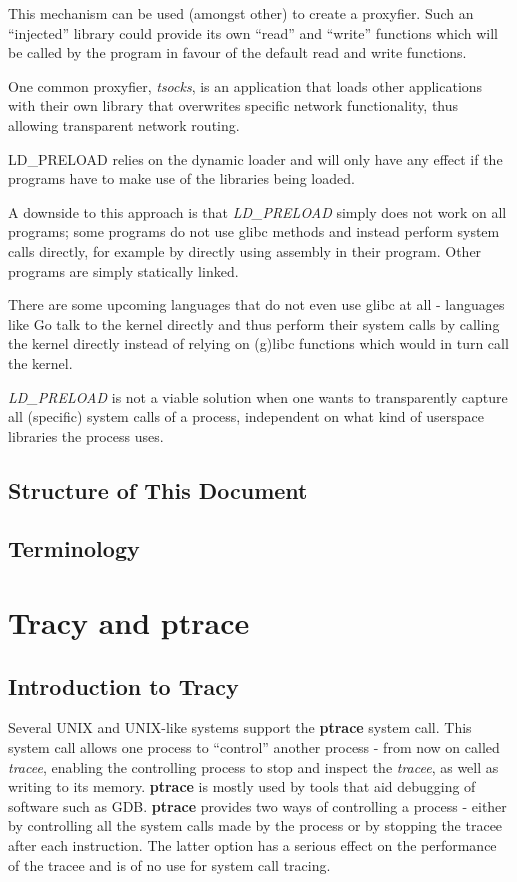 \documentclass[a4paper, 10pt]{report}
\begin{document}
This mechanism can be used (amongst other) to create a proxyfier.
Such an ``injected'' library could provide its own ``read'' and
``write'' functions which will be called by the program in favour of
the default read and write functions.

One common proxyfier, \textit{tsocks}, is an application that loads
other applications with their own library that overwrites specific
network functionality, thus allowing transparent network routing.

LD\_PRELOAD relies on the dynamic loader and will only have any effect
if the programs have to make use of the libraries being loaded.

A downside to this approach is that \textit{LD\_PRELOAD} simply does not work
on all programs; some programs do not use glibc methods and instead perform
system calls directly, for example by directly using assembly in their program.
Other programs are simply statically linked. %

There are some upcoming languages that do not even use glibc at all - languages
like Go \cite{golang} talk to the kernel directly and thus perform their
system calls by calling the kernel directly instead of
relying on (g)libc functions which would in turn call the kernel.

\textit{LD\_PRELOAD} is not a viable solution when one wants to transparently capture
all (specific) system calls of a process, independent on what kind of
userspace libraries the process uses.

\section{Structure of This Document}


\section{Terminology}


\chapter{Tracy and ptrace}

\section{Introduction to Tracy}
Several UNIX and UNIX-like systems support the \textbf{ptrace} system call.
This system call allows one process to ``control'' another process - from now on
called \textit{tracee}, enabling the controlling process to stop and inspect
the \textit{tracee}, as well as writing to its memory. \textbf{ptrace} is
mostly used by tools that aid debugging of software such as GDB\cite{gdb}.
\textbf{ptrace} provides two ways of controlling a process
- either by controlling all the system calls made by the process or by stopping
the tracee after each instruction. The latter option has a serious effect on the
performance of the tracee and is of no use for system call tracing.
\end{document}
